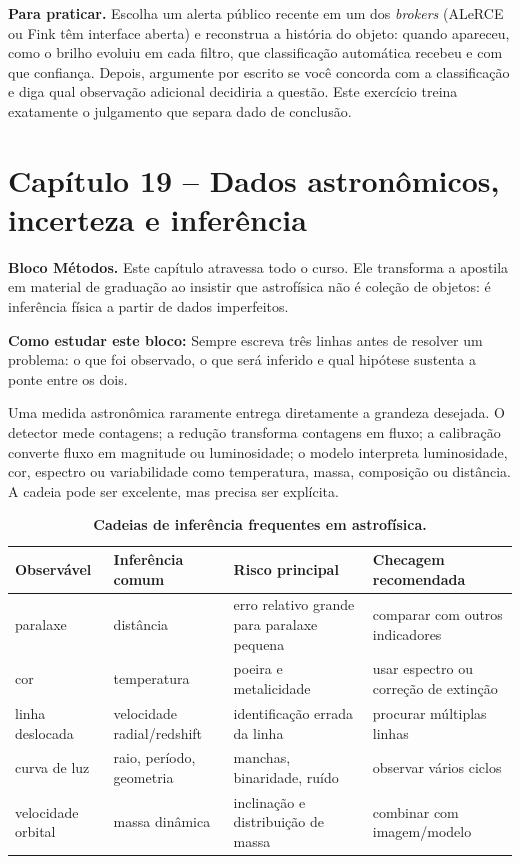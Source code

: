 \documentclass[11pt,a4paper]{article}
\newcommand{\aberturabloco}[3]{%
  \begin{noticebox}
  \textbf{Bloco #1.} #2

  \textbf{Como estudar este bloco:} #3
  \end{noticebox}
}
\begin{document}
\textbf{Para praticar.} Escolha um alerta público recente em um dos \textit{brokers} (ALeRCE ou Fink têm interface aberta) e reconstrua a história do objeto: quando apareceu, como o brilho evoluiu em cada filtro, que classificação automática recebeu e com que confiança. Depois, argumente por escrito se você concorda com a classificação e diga qual observação adicional decidiria a questão. Este exercício treina exatamente o julgamento que separa dado de conclusão.

\newpage
\section*{Capítulo 19 -- Dados astronômicos, incerteza e inferência}
\aberturabloco{Métodos}{Este capítulo atravessa todo o curso. Ele transforma a apostila em material de graduação ao insistir que astrofísica não é coleção de objetos: é inferência física a partir de dados imperfeitos.}{Sempre escreva três linhas antes de resolver um problema: o que foi observado, o que será inferido e qual hipótese sustenta a ponte entre os dois.}

Uma medida astronômica raramente entrega diretamente a grandeza desejada. O detector mede contagens; a redução transforma contagens em fluxo; a calibração converte fluxo em magnitude ou luminosidade; o modelo interpreta luminosidade, cor, espectro ou variabilidade como temperatura, massa, composição ou distância. A cadeia pode ser excelente, mas precisa ser explícita.

\begin{longtable}{>{\raggedright\arraybackslash}p{3.1cm}>{\raggedright\arraybackslash}p{3.8cm}>{\raggedright\arraybackslash}p{4.2cm}>{\raggedright\arraybackslash}p{3.1cm}}
\caption{\textbf{Cadeias de inferência frequentes em astrofísica.}}\\
\toprule
Observável & Inferência comum & Risco principal & Checagem recomendada \\
\midrule
paralaxe & distância & erro relativo grande para paralaxe pequena & comparar com outros indicadores \\
cor & temperatura & poeira e metalicidade & usar espectro ou correção de extinção \\
linha deslocada & velocidade radial/redshift & identificação errada da linha & procurar múltiplas linhas \\
curva de luz & raio, período, geometria & manchas, binaridade, ruído & observar vários ciclos \\
velocidade orbital & massa dinâmica & inclinação e distribuição de massa & combinar com imagem/modelo \\
\bottomrule
\end{longtable}
\end{document}
